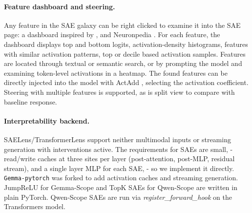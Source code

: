 \documentclass[11pt]{article}
\begin{document}


\paragraph{Feature dashboard and steering.}
Any feature in the SAE galaxy can be right clicked to examine it into the SAE page: a dashboard inspired by \citet{bricken2023monosemanticity},  and Neuronpedia \cite{neuronpedia}. For each feature, the dashboard displays top and bottom logits, activation-density histograms, features with similar activation patterns, top or decile based activation samples. Features are located through textual or semantic search, or by prompting the model and examining token-level activations in a heatmap. The found features can be directly injected into the model with ActAdd \cite{turner2024steeringlanguagemodelsactivation}, selecting the activation coefficient. Steering with multiple features is supported, as is split view to compare with baseline response. 


\paragraph{Interpretability backend.}

SAELens/TransformerLens \cite{bloom2024saetrainingcodebase, nanda2022transformerlens} support neither multimodal inputs or streaming generation with interventions active. The requirements for SAEs are small, - read/write caches at three sites per layer (post-attention, post-MLP, residual stream), and a single layer MLP for each SAE, - so we implement it directly. \texttt{Gemma-pytorch} was forked to add activation caches and streaming generation. JumpReLU \cite{rajamanoharan2024jumpingaheadimprovingreconstruction} for Gemma-Scope and 
TopK \cite{gao2024scalingevaluatingsparseautoencoders} SAEs for Qwen-Scope \cite{deng2026qwenscopeturningsparsefeatures} are written in plain PyTorch. Qwen-Scope SAEs are run via \textit{register\_forward\_hook} on the Transformers model.
\end{document}
